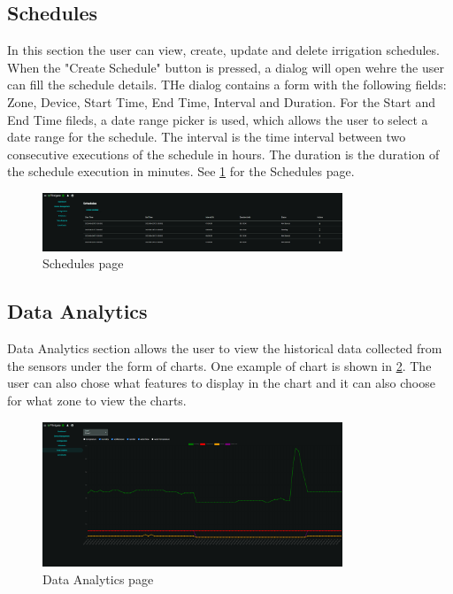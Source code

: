 \subsection{Schedules}
In this section the user can view, create, update and delete irrigation schedules. When the "Create Schedule" button is pressed, a dialog
will open wehre the user can fill the schedule details. THe dialog contains a form with the following fields:
Zone, Device, Start Time, End Time, Interval and Duration. For the Start and End Time fileds, a date range picker is used,
which allows the user to select a date range for the schedule. The interval is the time interval between two consecutive executions of the schedule in hours.
The duration is the duration of the schedule execution in minutes. See \ref{fig:schedules-page} for the Schedules page. 

\begin{figure}[H]
    \centering
    \includegraphics[width=0.8\textwidth]{images/schedules.png}
    \caption{Schedules page}
    \label{fig:schedules-page}
\end{figure}

\subsection{Data Analytics}
Data Analytics section allows the user to view the historical data collected from the sensors under the form of charts. One example 
of chart is shown in \ref{fig:analytics-page}. The user can also chose what features to display in the chart and it can also choose for what zone to
view the charts. 
\begin{figure}[H]
    \centering
    \includegraphics[width=0.8\textwidth]{images/analytics.png}
    \caption{Data Analytics page}
    \label{fig:analytics-page}
\end{figure}

